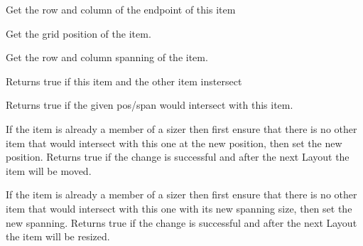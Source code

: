 Get the row and column of the endpoint of this item

\label{wxgbsizeritemgetpos}



Get the grid position of the item.

\label{wxgbsizeritemgetspan}



Get the row and column spanning of the item.

\label{wxgbsizeritemintersects}


Returns true if this item and the other item instersect


Returns true if the given pos/span would intersect with this item.

\label{wxgbsizeritemsetpos}


If the item is already a member of a sizer then first ensure that
there is no other item that would intersect with this one at the new
position, then set the new position. Returns true if the change is
successful and after the next Layout the item will be moved.

\label{wxgbsizeritemsetspan}


If the item is already a member of a sizer then first ensure that
there is no other item that would intersect with this one with its new
spanning size, then set the new spanning. Returns true if the change
is successful and after the next Layout the item will be resized.

